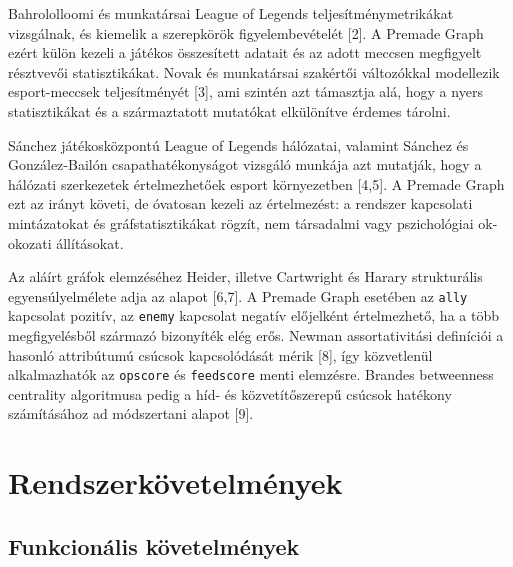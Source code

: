 \documentclass[12pt,a4paper]{article}
\begin{document}
Bahrololloomi és munkatársai League of Legends teljesítménymetrikákat vizsgálnak, és kiemelik a szerepkörök figyelembevételét [2]. A Premade Graph ezért külön kezeli a játékos összesített adatait és az adott meccsen megfigyelt résztvevői statisztikákat. Novak és munkatársai szakértői változókkal modellezik esport-meccsek teljesítményét [3], ami szintén azt támasztja alá, hogy a nyers statisztikákat és a származtatott mutatókat elkülönítve érdemes tárolni.

Sánchez játékosközpontú League of Legends hálózatai, valamint Sánchez és González-Bailón csapathatékonyságot vizsgáló munkája azt mutatják, hogy a hálózati szerkezetek értelmezhetőek esport környezetben [4,5]. A Premade Graph ezt az irányt követi, de óvatosan kezeli az értelmezést: a rendszer kapcsolati mintázatokat és gráfstatisztikákat rögzít, nem társadalmi vagy pszichológiai ok-okozati állításokat.

Az aláírt gráfok elemzéséhez Heider, illetve Cartwright és Harary strukturális egyensúlyelmélete adja az alapot [6,7]. A Premade Graph esetében az \texttt{ally} kapcsolat pozitív, az \texttt{enemy} kapcsolat negatív előjelként értelmezhető, ha a több megfigyelésből származó bizonyíték elég erős. Newman assortativitási definíciói a hasonló attribútumú csúcsok kapcsolódását mérik [8], így közvetlenül alkalmazhatók az \texttt{opscore} és \texttt{feedscore} menti elemzésre. Brandes betweenness centrality algoritmusa pedig a híd- és közvetítőszerepű csúcsok hatékony számításához ad módszertani alapot [9].

\section{Rendszerkövetelmények}

\subsection{Funkcionális követelmények}
\end{document}
